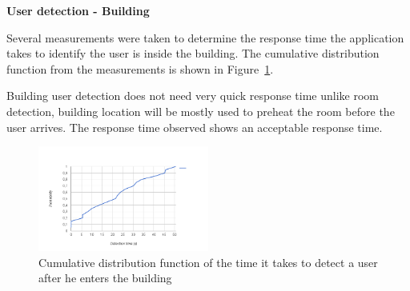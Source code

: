 \documentclass[conference]{IEEEtran}
\begin{document}
\textbf{User detection - Building}

Several measurements were taken to determine the response time the application takes to identify the user is inside the building. The cumulative distribution function from the measurements is shown in Figure~\ref{eval:building1}.

Building user detection does not need very quick response time unlike room detection, building location will be mostly used to preheat the room before the user arrives. The response time observed shows an acceptable response time.


\begin{figure}[]
\centering
\includegraphics[width=0.5\textwidth]{Figures/building_detection_cumulative}
\caption{Cumulative distribution function of the time it takes to detect a user  after he enters the building}
\label{eval:building1}
\end{figure}
\end{document}

